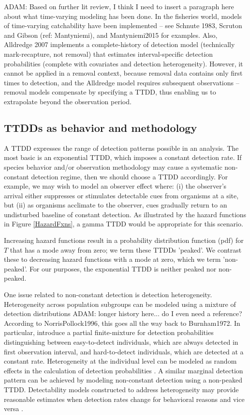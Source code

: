 \documentclass[useAMS,usenatbib,referee,12pt]{article}
\newcommand{\adam}[1]{{\color{blue} ADAM: #1}}
\begin{document}
\adam{Based on further lit review, I think I need to insert a paragraph here about what time-varying modeling has been done.  In the fisheries world, models of time-varying catchability have been implemented -- see Schnute 1983, Scruton and Gibson (ref: Mantyniemi), and Mantyniemi2015 for examples.  Also, Alldredge 2007 implements a complete-history of detection model (technically mark-recapture, not removal) that estimates interval-specific detection probabilities (complete with covariates and detection heterogeneity).  However, it cannot be applied in a removal context, because removal data contains only first times to detection, and the Alldredge model requires subsequent observations -- removal models compensate by specifying a TTDD, thus enabling us to extrapolate beyond the observation period.}  

\subsection{TTDDs as behavior and methodology}

A TTDD expresses the range of detection patterns possible in an analysis.  The most basic is an exponential TTDD, which imposes a constant detection rate.  If species behavior and/or observation methodology may cause a systematic non-constant detection regime, then we should choose a TTDD accordingly.  For example, we may wish to model an observer effect where: (i) the observer's arrival either suppresses or stimulates detectable cues from organisms at a site, but (ii) as organisms acclimate to the observer, cues gradually return to an undisturbed baseline of constant detection.  As illustrated by the hazard functions in Figure \ref{HazardFxns}, a gamma TTDD would be appropriate for this scenario.

Increasing hazard functions result in a probability distribution function (pdf) for $T$ that has a mode away from zero; we term these TTDDs 'peaked'.  We contrast these to decreasing hazard functions with a mode at zero, which we term 'non-peaked'.  For our purposes, the exponential TTDD is neither peaked nor non-peaked.

One issue related to non-constant detection is detection heterogeneity.  Heterogeneity across population subgroups can be modeled using a mixture of detection distributions \citep{Pledger2000}\adam{longer history here... do I even need a reference? According to NorrisPollock1996, this goes all the way back to Burnham1972}.  In particular, \citet{Farnsworth2002} introduce a partial finite-mixture for detection probabilities distinguishing between easy-to-detect individuals, which are always detected in first observation interval, and hard-to-detect individuals, which are detected at a constant rate.   Heterogeneity at the individual level can be modeled as random effects in the calculation of detection probabilities \citep{DorazioRoyle2003, Mantyniemi2005}.  A similar marginal detection pattern can be achieved by modeling non-constant detection using a non-peaked TTDD.  Detectability models constructed to address heterogeneity may provide reasonable estimates when detection rates change for behavioral reasons and vice versa \citep{Mantyniemi2005}.
\end{document}
